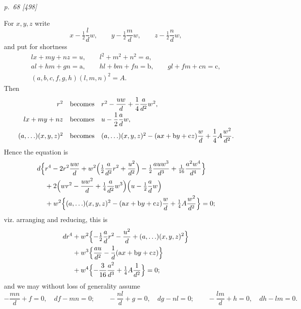 \documentclass[11pt,a4paper]{article}
\newcommand{\pagemarker}[2]{\clearpage\noindent\textit{p.~#1 [#2]}\par\medskip}
\newcommand{\qf}[2]{(#1)(#2)^2}
\newcommand{\half}{\tfrac{1}{2}}
\newcommand{\quart}{\tfrac{1}{4}}
\newcommand{\sixteenth}{\tfrac{1}{16}}
\begin{document}
\pagemarker{68}{498}
For \(x,y,z\) write
\[
  x-\half\frac{l}{d}w,\qquad
  y-\half\frac{m}{d}w,\qquad
  z-\half\frac{n}{d}w,
\]
and put for shortness
\[
\begin{gathered}
  lx+my+nz=u,\qquad l^2+m^2+n^2=a,\\
  al+hm+gn=\mathrm{a},\qquad
  hl+bm+fn=\mathrm{b},\qquad
  gl+fm+cn=\mathrm{c},\\
  \qf{a,b,c,f,g,h}{l,m,n}=A.
\end{gathered}
\]
Then
\[
\begin{array}{rcl}
r^2&\hbox{becomes}& r^2-\dfrac{uw}{d}+\dfrac14\dfrac{a}{d^2}w^2,\\[6pt]
lx+my+nz&\hbox{becomes}& u-\dfrac12\dfrac{a}{d}w,\\[6pt]
\qf{a,\ldots}{x,y,z}&\hbox{becomes}&
\qf{a,\ldots}{x,y,z}-(\mathrm{a}x+\mathrm{b}y+\mathrm{c}z)\dfrac{w}{d}
+\dfrac14 A\dfrac{w^2}{d^2}.
\end{array}
\]
Hence the equation is
\[
\begin{aligned}
d\Bigl\{&r^4-2r^2\frac{uw}{d}
+w^2\Bigl(\half\frac{a}{d^2}r^2+\frac{u^2}{d^2}\Bigr)
-\half\frac{auw^3}{d^3}
+\sixteenth\frac{a^2w^4}{d^4}\Bigr\}\\
&+2\Bigl(wr^2-\frac{uw^2}{d}
+\quart\frac{a}{d^2}w^3\Bigr)
\Bigl(u-\half\frac{a}{d}w\Bigr)\\
&+w^2\Bigl\{\qf{a,\ldots}{x,y,z}-(\mathrm{a}x+\mathrm{b}y+\mathrm{c}z)\frac{w}{d}
+\quart A\frac{w^2}{d^2}\Bigr\}=0;
\end{aligned}
\]
viz. arranging and reducing, this is
\[
\begin{aligned}
dr^4
&+w^2\Bigl\{-\half\frac{a}{d}r^2-\frac{u^2}{d}
+\qf{a,\ldots}{x,y,z}\Bigr\}\\
&+w^3\Bigl\{\frac{au}{d^2}-\frac1d(\mathrm{a}x+\mathrm{b}y+\mathrm{c}z)\Bigr\}\\
&+w^4\Bigl\{-\frac3{16}\frac{a^2}{d^3}+\quart A\frac1{d^2}\Bigr\}=0;
\end{aligned}
\]
and we may without loss of generality assume
\[
 -\frac{mn}{d}+f=0,\quad df-mn=0;\qquad
 -\frac{nl}{d}+g=0,\quad dg-nl=0;\qquad
 -\frac{lm}{d}+h=0,\quad dh-lm=0.
\]
\end{document}
